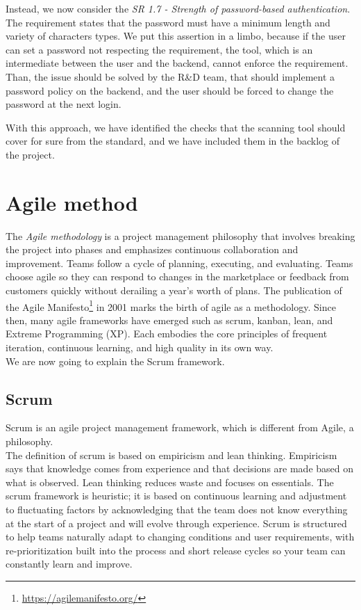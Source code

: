 Instead, we now consider the \textit{SR 1.7 - Strength of password-based authentication}. The requirement states that the password must have a minimum length and variety of characters types. We put this assertion in a limbo, because if the user can set a password not respecting the requirement, the tool, which is an intermediate between the user and the backend, cannot enforce the requirement. Than, the issue should be solved by the R\&D team, that should implement a password policy on the backend, and the user should be forced to change the password at the next login.

With this approach, we have identified the checks that the scanning tool should cover for sure from the standard, and we have included them in the backlog of the project.

\section{Agile method}

The \textit{Agile methodology} is a project management philosophy that involves breaking the project into phases and emphasizes continuous collaboration and improvement. Teams follow a cycle of planning, executing, and evaluating. Teams choose agile so they can respond to changes in the marketplace or feedback from customers quickly without derailing a year's worth of plans. The publication of the Agile Manifesto\footnote{\url{https://agilemanifesto.org/}} in 2001 marks the birth of agile as a methodology. Since then, many agile frameworks have emerged such as scrum, kanban, lean, and Extreme Programming (XP). Each embodies the core principles of frequent iteration, continuous learning, and high quality in its own way.~\cite{agile-methodology} \\
We are now going to explain the Scrum framework.

\subsection{Scrum}

Scrum is an agile project management framework, which is different from Agile, a philosophy.\\
The definition of scrum is based on empiricism and lean thinking. Empiricism says that knowledge comes from experience and that decisions are made based on what is observed. Lean thinking reduces waste and focuses on essentials. The scrum framework is heuristic; it is based on continuous learning and adjustment to fluctuating factors by acknowledging that the team does not know everything at the start of a project and will evolve through experience. Scrum is structured to help teams naturally adapt to changing conditions and user requirements, with re-prioritization built into the process and short release cycles so your team can constantly learn and improve.~\cite{scrum}

